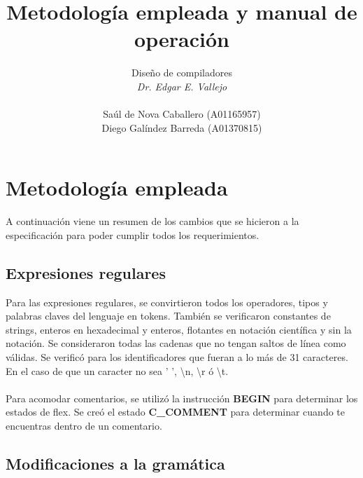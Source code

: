 \documentclass[11pt]{article}
\begin{document}
\title{Metodología empleada y manual de operación}
\author{
    \Large Diseño de compiladores
    \\
    \textit{Dr. Edgar E. Vallejo}
    \\
    \\
    Saúl de Nova Caballero (A01165957)
    \\
    Diego Galíndez Barreda (A01370815)
}
\maketitle

\section{Metodología empleada}

A continuación viene un resumen de los cambios que se hicieron a la especificación para poder cumplir todos los requerimientos.

\subsection{Expresiones regulares}

Para las expresiones regulares, se convirtieron todos los operadores, tipos y palabras claves del lenguaje en tokens. También 
se verificaron constantes de strings, enteros en hexadecimal y enteros, flotantes en notación científica y sin la notación. 
Se consideraron todas las cadenas que no tengan saltos de línea como válidas. Se verificó para los identificadores que fueran 
a lo más de 31 caracteres. En el caso de que un caracter no sea ' ', \textbackslash n, \textbackslash r ó \textbackslash t.
\\\\
Para acomodar comentarios, se utilizó la instrucción \textbf{BEGIN} para determinar los estados de flex. Se creó el estado 
\textbf{C\_COMMENT} para determinar cuando te encuentras dentro de un comentario.

\subsection{Modificaciones a la gramática}
\end{document}
